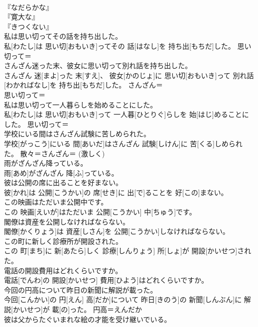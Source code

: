 \documentclass[8pt]{extreport}
\begin{document}
\begin{CJK}{UTF8}{min}
\\	『なだらかな』
\\	『寛大な』
\\	『きつくない』
\\	私は思い切ってその話を持ち出した。	
\\	私[わたし]は 思い切[おもいき]ってその 話[はなし]を 持ち出[もちだ]した。	思い切って＝ 
\\	さんざん迷った末、彼女に思い切って別れ話を持ち出した。	
\\	さんざん 迷[まよ]った 末[すえ]、 彼女[かのじょ]に 思い切[おもいき]って 別れ話[わかればなし]を 持ち出[もちだ]した。	さんざん＝ 
\\	思い切って＝ 
\\	私は思い切って一人暮らしを始めることにした。	
\\	私[わたし]は 思い切[おもいき]って 一人暮[ひとりぐ]らしを 始[はじ]めることにした。	思い切って＝ 
\\	学校にいる間はさんざん試験に苦しめられた。	
\\	学校[がっこう]にいる 間[あいだ]はさんざん 試験[しけん]に 苦[くる]しめられた。	散々＝さんざん＝ (激しく) 
\\	雨がざんざん降っている。	
\\	雨[あめ]がざんざん 降[ふ]っている。	
\\	彼は公開の席に出ることを好まない。	
\\	彼[かれ]は 公開[こうかい]の 席[せき]に 出[で]ることを 好[この]まない。	
\\	この映画はただいま公開中です。	
\\	この 映画[えいが]はただいま 公開[こうかい] 中[ちゅう]です。	
\\	閣僚は資産を公開しなければならない。	
\\	閣僚[かくりょう]は 資産[しさん]を 公開[こうかい]しなければならない。	
\\	この町に新しく診療所が開設された。	
\\	この 町[まち]に 新[あたら]しく 診療[しんりょう] 所[しょ]が 開設[かいせつ]された。	
\\	電話の開設費用はどれくらいですか。	
\\	電話[でんわ]の 開設[かいせつ] 費用[ひよう]はどれくらいですか。	
\\	今回の円高について昨日の新聞に解説が載った。	
\\	今回[こんかい]の 円[えん] 高[だか]について 昨日[きのう]の 新聞[しんぶん]に 解説[かいせつ]が 載[の]った。	円高＝えんだか
\\	彼は父からたぐいまれな絵の才能を受け継いでいる。	

\end{CJK}
\end{document}
